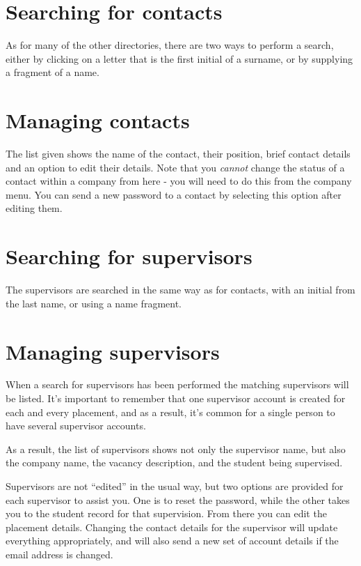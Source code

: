 \documentclass[12 pt]{book}
\begin{document}
\section{Searching for contacts}

As for many of the other directories, there are two ways to perform a search, either by clicking on
a letter that is the first initial of a surname, or by supplying a fragment of a name.

\section{Managing contacts}

The list given shows the name of the contact, their position, brief contact details and an option to
edit their details. Note that you \emph{cannot} change the status of a contact within a company
from here - you will need to do this from the company menu. You can send a new password to a contact
by selecting this option after editing them.

\section{Searching for supervisors}

The supervisors are searched in the same way as for contacts, with an initial from the last name,
or using a name fragment.

\section{Managing supervisors}

When a search for supervisors has been performed the matching supervisors will
be listed. It's important to remember that one supervisor account is created
for each and every placement, and as a result, it's common for a single
person to have several supervisor accounts.

As a result, the list of supervisors shows not only the supervisor name, but
also the company name, the vacancy description, and the student being
supervised.

Supervisors are not ``edited'' in the usual way, but two options are provided
for each supervisor to assist you. One is to reset the password, while the
other takes you to the student record for that supervision. From there you can
edit the placement details. Changing the contact details for the supervisor
will update everything appropriately, and will also send a new set of account
details if the email address is changed.
\end{document}
